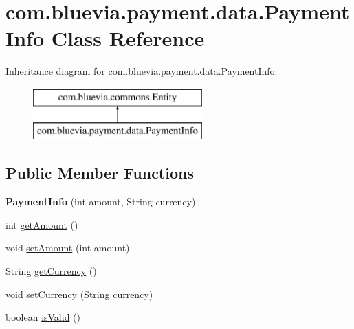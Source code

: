 \hypertarget{classcom_1_1bluevia_1_1payment_1_1data_1_1PaymentInfo}{
\section{com.bluevia.payment.data.PaymentInfo Class Reference}
\label{classcom_1_1bluevia_1_1payment_1_1data_1_1PaymentInfo}
}
Inheritance diagram for com.bluevia.payment.data.PaymentInfo:\begin{figure}[H]
\begin{center}
\leavevmode
\includegraphics[height=2.000000cm]{classcom_1_1bluevia_1_1payment_1_1data_1_1PaymentInfo}
\end{center}
\end{figure}
\subsection*{Public Member Functions}
\begin{DoxyCompactItemize}
\item 
\hypertarget{classcom_1_1bluevia_1_1payment_1_1data_1_1PaymentInfo_a46e5799458cd717832249c31b9b59e79}{
{\bfseries PaymentInfo} (int amount, String currency)}
\label{classcom_1_1bluevia_1_1payment_1_1data_1_1PaymentInfo_a46e5799458cd717832249c31b9b59e79}

\item 
int \hyperlink{classcom_1_1bluevia_1_1payment_1_1data_1_1PaymentInfo_a69ce5eeed1ccd45e530e36e11d80a732}{getAmount} ()
\item 
void \hyperlink{classcom_1_1bluevia_1_1payment_1_1data_1_1PaymentInfo_a6bd0e1c9c722a1fbb75fa057e7c898cc}{setAmount} (int amount)
\item 
String \hyperlink{classcom_1_1bluevia_1_1payment_1_1data_1_1PaymentInfo_a7a310d4a54140a1add3a0c694a656e64}{getCurrency} ()
\item 
void \hyperlink{classcom_1_1bluevia_1_1payment_1_1data_1_1PaymentInfo_a3074999566bc67c28b03798d45991cc8}{setCurrency} (String currency)
\item 
boolean \hyperlink{classcom_1_1bluevia_1_1payment_1_1data_1_1PaymentInfo_aff2bd4e84a469e86f401c4d8a78d4ac9}{isValid} ()
\end{DoxyCompactItemize}
